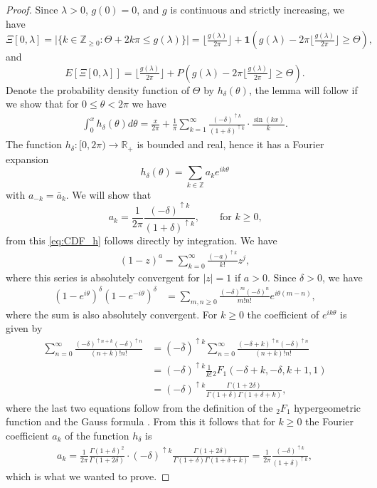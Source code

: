 \documentclass[12pt]{article}
\theoremstyle{definition} %
\newcommand{\Z}{{\mathbb Z}}
\newcommand{\R}{{\mathbb R}}
\theoremstyle{remark} %
\newcommand{\ind}{\mathbf 1}
\begin{document}
\begin{proof}
Since $\lambda>0$, $g(0)=0$, and $g$ is continuous and strictly increasing, we have
\[
\Xi[0,\lambda]=\big|\{k\in \Z_{\ge 0}: \Theta+2k\pi\le g(\lambda) \}\big|=\lfloor\tfrac{g(\lambda)}{2\pi} \rfloor+\ind \left(g(\lambda)-2\pi \lfloor\tfrac{g(\lambda)}{2\pi}\rfloor\ge \Theta \right),
\]
and
\[
E[\Xi[0,\lambda]]=\lfloor\tfrac{g(\lambda)}{2\pi} \rfloor+P\left(g(\lambda)-2\pi \lfloor\tfrac{g(\lambda)}{2\pi}\rfloor\ge \Theta \right).
\]
Denote the probability density function of $\Theta$ by $h_\delta(\theta)$, the lemma will follow if we show that  for $0\le \theta<2\pi$ we have
\begin{align} \label{eq:CDF_h}
    \int_0^x  h_\delta(\theta) d\theta=\frac{x}{2\pi}+\frac1{\pi} \sum_{k=1}^\infty  \frac{(-\delta)^{\uparrow k}}{(1+\delta)^{\uparrow k}}\cdot \frac{\sin(k x)}{k}. 
\end{align}
The function $h_\delta:[0,2\pi)\to \R_+$ is bounded and real, hence it has a Fourier expansion 
\[
h_\delta(\theta)=\sum_{k\in \Z} a_k e^{i k \theta}
\]
with $a_{-k}=\bar a_k$. We will show that 
\[
a_k=\frac{1}{2\pi} \frac{(-\delta)^{\uparrow k}}{(1+\delta)^{\uparrow k}}, \qquad \text{for $k\ge 0$,}
\]
from this \eqref{eq:CDF_h} follows directly by integration. 
We have 
\begin{align*}
    (1-z)^a=\sum_{k=0}^\infty \frac{(-a)^{\uparrow k}}{k!} z^j,
\end{align*}
where this series is absolutely convergent for $|z|=1$ if $ a>0$. Since $\delta>0$, we have
\begin{align*}
     (1-e^{i \theta})^{\delta}(1-e^{-i \theta})^{ \delta}&= \sum_{m, n\ge 0}
\frac{(- \delta)^m (-\delta)^n}{m! n!} e^{i \theta (m-n)},
\end{align*}
where the sum is also absolutely convergent. For $k\ge 0$ the coefficient of $e^{i k \theta}$ is given by
\begin{align*}
    \sum_{n=0}^\infty \frac{(-\delta)^{\uparrow n+k} (-\delta)^{\uparrow n}}{(n+k)! n!}&=
    (-\bar \delta)^{\uparrow k}\sum_{n=0}^\infty  \frac{(- \delta+k)^{\uparrow n} (-\delta)^{\uparrow n}}{(n+k)! n!}\\
    &=(-\delta)^{\uparrow k} \frac{1}{k!} { }_2F_1(-\delta+k, -\delta, k+1,1)\\
    &=(- \delta)^{\uparrow k}  \frac{ \Gamma(1+2\delta)}{\Gamma(1+ \delta)\Gamma(1+\delta+k)},
\end{align*}
where the last two equations follow from the definition of the $_2F_1$ hypergeometric function and the Gauss formula \cite{andrews1999special}. From this it follows that for $k\ge 0$ the Fourier coefficient $a_k$ of the function $h_\delta$ is 
\begin{align*}
    a_k=\frac{1}{2\pi} \frac{\Gamma(1+\delta)^2}{\Gamma(1+2\delta)} \cdot  (-\delta)^{\uparrow k}  \frac{ \Gamma(1+2\delta)}{\Gamma(1+ \delta)\Gamma(1+\delta+k)}=\frac{1}{2\pi}\frac{ (- \delta)^{\uparrow k} }{(1+\delta)^{\uparrow k}},
\end{align*}
which is what we wanted to prove.
\end{proof}
\end{document}
